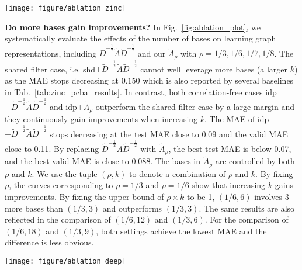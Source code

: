 \documentclass[nohyperref]{article}
\theoremstyle{plain}
\theoremstyle{definition}
\theoremstyle{remark}
\begin{document}
\begin{figure*}[h]
	\centering
	\texttt{[image: figure/ablation\_zinc]}
	\vspace{-10pt}
	\caption{Ablation study results on ZINC with different number of bases $k$.}
	\label{fig:ablation_plot}
	\vspace{-10pt}
\end{figure*}

\textbf{Do more bases gain improvements?}
In Fig.~\ref{fig:ablation_plot}, we systematically evaluate the effects of the number of bases on learning graph representations, including $\tilde{D}^{-\frac{1}{2}}\tilde{A}\tilde{D}^{-\frac{1}{2}}$ and our $\tilde A_{\rho}$ with $\rho=1/3, 1/6, 1/7, 1/8$.
The shared filter case, i.e. shd$+\tilde{D}^{-\frac{1}{2}}\tilde{A}\tilde{D}^{-\frac{1}{2}}$ cannot well leverage more bases (a larger $k$) as the MAE stops decreasing at $0.150$ which is also reported by several baselines in Tab.~\ref{tab:zinc_pcba_results}.
In contrast, both correlation-free cases idp$+\tilde{D}^{-\frac{1}{2}}\tilde{A}\tilde{D}^{-\frac{1}{2}}$ and idp$+\tilde A_{\rho}$ outperform the shared filter case by a large margin and they continuously gain improvements when increasing $k$.
The MAE of idp$+\tilde{D}^{-\frac{1}{2}}\tilde{A}\tilde{D}^{-\frac{1}{2}}$ stops decreasing at the test MAE close to 0.09 and the valid MAE close to 0.11.
By replacing $\tilde{D}^{-\frac{1}{2}}\tilde{A}\tilde{D}^{-\frac{1}{2}}$ with $\tilde A_{\rho}$, the best test MAE is below 0.07, and the best valid MAE is close to 0.088.
The bases in $\tilde A_{\rho}$ are controlled by both $\rho$ and $k$.
We use the tuple $(\rho, k)$ to denote a combination of $\rho$ and $k$.
By fixing $\rho$, the curves corresponding to $\rho=1/3$ and $\rho=1/6$ show that increasing $k$ gains improvements.
By fixing the upper bound of $\rho\times k$ to be 1, $(1/6, 6)$ involves 3 more bases than $(1/3, 3)$ and outperforms $(1/3, 3)$.
The same results are also reflected in the comparison of $(1/6, 12)$ and $(1/3, 6)$.
For the comparison of $(1/6, 18)$ and $(1/3, 9)$, both settings achieve the lowest MAE and the difference is less obvious.

\begin{figure*}[h]
	\centering
	\texttt{[image: figure/ablation\_deep]}
	\vspace{-10pt}
	\caption{Ablation study results on ZINC with different number of layers.}
	\label{fig:zinc_depth}
	\vspace{-10pt}
\end{figure*}
\end{document}
